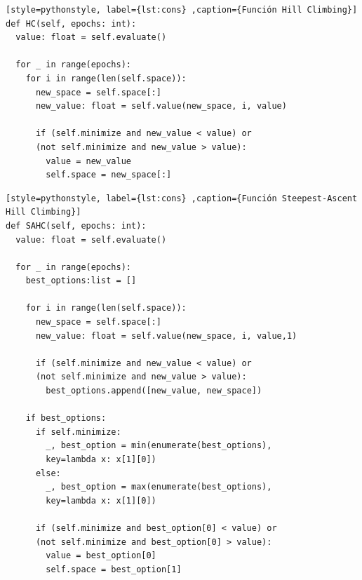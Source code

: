 \documentclass[12pt,twoside]{article}
\begin{document}
\begin{lstlisting}[style=pythonstyle, label={lst:cons} ,caption={Función Hill Climbing}]
def HC(self, epochs: int):
  value: float = self.evaluate()

  for _ in range(epochs):
    for i in range(len(self.space)):
      new_space = self.space[:]
      new_value: float = self.value(new_space, i, value)

      if (self.minimize and new_value < value) or 
      (not self.minimize and new_value > value):
        value = new_value
        self.space = new_space[:]
\end{lstlisting}

\begin{lstlisting}[style=pythonstyle, label={lst:cons} ,caption={Función Steepest-Ascent Hill Climbing}]
def SAHC(self, epochs: int):
  value: float = self.evaluate()

  for _ in range(epochs):
    best_options:list = []

    for i in range(len(self.space)):
      new_space = self.space[:]
      new_value: float = self.value(new_space, i, value,1)

      if (self.minimize and new_value < value) or 
      (not self.minimize and new_value > value):
        best_options.append([new_value, new_space])

    if best_options: 
      if self.minimize:
        _, best_option = min(enumerate(best_options), 
        key=lambda x: x[1][0])
      else:    
        _, best_option = max(enumerate(best_options), 
        key=lambda x: x[1][0])
      
      if (self.minimize and best_option[0] < value) or 
      (not self.minimize and best_option[0] > value):
        value = best_option[0]  
        self.space = best_option[1]  
\end{lstlisting}
\end{document}
